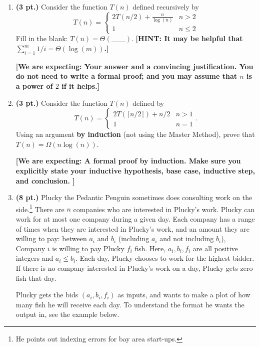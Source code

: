 \documentclass{article}
\newcommand{\expecting}[1]{\noindent\textbf{[We are expecting: #1]}}
\newcommand{\hint}[1]{\noindent\textbf{[HINT: #1]}}
\newcommand{\pts}[1]{\textbf{(#1 pt.)}}
\begin{document}
\begin{enumerate}
\item\pts{3} Consider the function $T(n)$ defined recursively by
\[ T(n) = \begin{cases} 2 T(n/2) + \frac{n}{\log(n)}  & n > 2 \\ 1  & n \leq 2 \end{cases}\]  
Fill in the blank: $T(n) = \Theta( \_\_\_\_\_\_ )$.
\hint{It may be helpful that $\sum_{i=1}^m 1/i = \Theta(\log(m))$.}

\expecting{Your answer and a convincing justification.  You do not need to write a formal proof; and you may assume that $n$ is a power of $2$ if it helps.}


\vspace{1cm}
\item \pts{3} Consider the function $T(n)$ defined by
\[ T(n) = \begin{cases} 2T(\lceil n/2 \rceil) + n/2 & n > 1 \\ 1 & n = 1 \end{cases}. \]
Using an argument \textbf{by induction} (not using the Master Method), prove that $T(n) = \Omega(n \log(n))$.  

\expecting{A formal proof by induction.  Make sure you explicitly state your inductive hypothesis, base case, inductive step, and conclusion.  }



\vspace{1cm}
\item \pts{8}
Plucky the Pedantic Penguin sometimes does consulting work on the side.\footnote{He points out indexing errors for bay area start-ups.}  There are $n$ companies who are interested in Plucky's work.   Plucky can work for at most one company during a given day.   Each company has a range of times when they are interested in Plucky's work, and an amount they are willing to pay: 
between $a_i$ and $b_i$ (including $a_i$ and not including $b_i$), Company $i$ is willing to pay Plucky $f_i$ fish.  Here, $a_i,b_i,f_i$ are all positive integers and $a_i \leq b_i$.  Each day, Plucky chooses to work for the highest bidder.  If there is no company interested in Plucky's work on a day, Plucky gets zero fish that day.

Plucky gets the bids $(a_i,b_i,f_i)$ as inputs, and wants to make a plot of how many fish he will receive each day.   To understand the format he wants the output in, see the example below.

\noindent{}
\end{enumerate}
\end{document}
